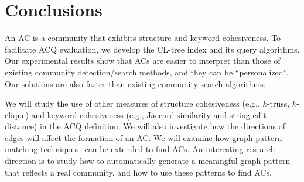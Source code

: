 \section{Conclusions}
\label{conclusion}

An AC is a community that exhibits structure and keyword cohesiveness. To facilitate ACQ evaluation, we develop the CL-tree index and its query algorithms. Our experimental results show that ACs are
easier to interpret than those of existing community detection/search methods,
and they can be ``personalized''. Our solutions are also faster than existing community search algorithms.

We will study the use of other measures of structure cohesiveness (e.g., $k$-truss, $k$-clique) and keyword cohesiveness (e.g., Jaccard similarity and string edit distance) in the ACQ definition.
We will also investigate how the directions of edges will affect the formation of an AC.
We will examine how graph pattern matching techniques~\cite{GPM-KDD2007,GPM-VLDB2010,GPM-PVLDB2015} can be extended to find ACs. An interesting research direction is to study how to automatically generate a meaningful graph pattern that reflects a real community, and how to use these patterns to find ACs.

